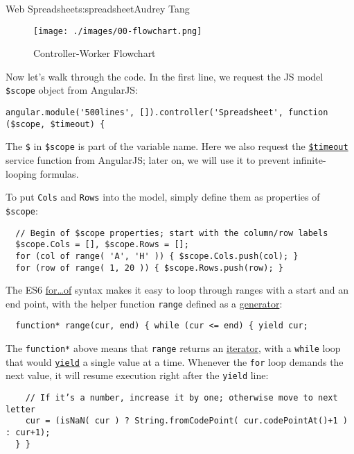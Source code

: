 \begin{aosachapter}{Web Spreadsheet}{s:spreadsheet}{Audrey Tang}
\begin{figure}[htbp]
\centering
\texttt{[image: ./images/00-flowchart.png]}
\caption{Controller-Worker Flowchart}
\end{figure}

Now let's walk through the code. In the first line, we request the JS
model \texttt{\$scope} object from AngularJS:

\begin{verbatim}
angular.module('500lines', []).controller('Spreadsheet', function ($scope, $timeout) {
\end{verbatim}

The \texttt{\$} in \texttt{\$scope} is part of the variable name. Here
we also request the
\href{https://docs.angularjs.org/api/ng/service/\$timeout}{\texttt{\$timeout}}
service function from AngularJS; later on, we will use it to prevent
infinite-looping formulas.

To put \texttt{Cols} and \texttt{Rows} into the model, simply define
them as properties of \texttt{\$scope}:

\begin{verbatim}
  // Begin of $scope properties; start with the column/row labels
  $scope.Cols = [], $scope.Rows = [];
  for (col of range( 'A', 'H' )) { $scope.Cols.push(col); }
  for (row of range( 1, 20 )) { $scope.Rows.push(row); }
\end{verbatim}

The ES6
\href{https://developer.mozilla.org/en-US/docs/Web/JavaScript/Reference/Statements/for...of}{for\ldots{}of}
syntax makes it easy to loop through ranges with a start and an end
point, with the helper function \texttt{range} defined as a
\href{https://developer.mozilla.org/en-US/docs/Web/JavaScript/Reference/Statements/function*}{generator}:

\begin{verbatim}
  function* range(cur, end) { while (cur <= end) { yield cur;
\end{verbatim}

The \texttt{function*} above means that \texttt{range} returns an
\href{https://developer.mozilla.org/en-US/docs/Web/JavaScript/Guide/The_Iterator_protocol}{iterator},
with a \texttt{while} loop that would
\href{https://developer.mozilla.org/en-US/docs/Web/JavaScript/Reference/Operators/yield}{\texttt{yield}}
a single value at a time. Whenever the \texttt{for} loop demands the
next value, it will resume execution right after the \texttt{yield}
line:

\begin{verbatim}
    // If it’s a number, increase it by one; otherwise move to next letter
    cur = (isNaN( cur ) ? String.fromCodePoint( cur.codePointAt()+1 ) : cur+1);
  } }
\end{verbatim}


\end{aosachapter}
